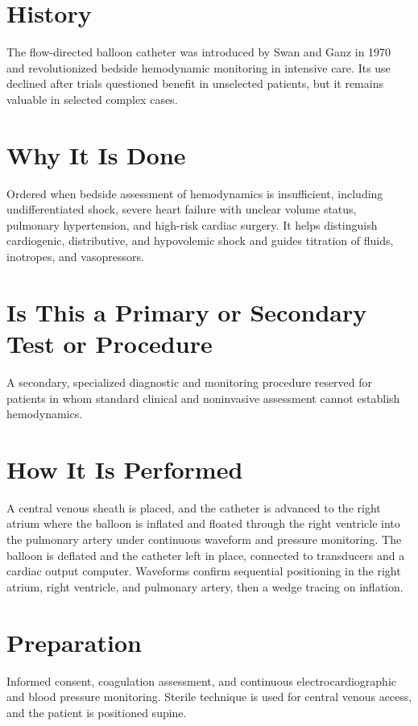 \section*{History}
The flow-directed balloon catheter was introduced by Swan and Ganz in 1970 and revolutionized bedside hemodynamic monitoring in intensive care. Its use declined after trials questioned benefit in unselected patients, but it remains valuable in selected complex cases.

\section*{Why It Is Done}
Ordered when bedside assessment of hemodynamics is insufficient, including undifferentiated shock, severe heart failure with unclear volume status, pulmonary hypertension, and high-risk cardiac surgery. It helps distinguish cardiogenic, distributive, and hypovolemic shock and guides titration of fluids, inotropes, and vasopressors.

\section*{Is This a Primary or Secondary Test or Procedure}
A secondary, specialized diagnostic and monitoring procedure reserved for patients in whom standard clinical and noninvasive assessment cannot establish hemodynamics.

\section*{How It Is Performed}
A central venous sheath is placed, and the catheter is advanced to the right atrium where the balloon is inflated and floated through the right ventricle into the pulmonary artery under continuous waveform and pressure monitoring. The balloon is deflated and the catheter left in place, connected to transducers and a cardiac output computer. Waveforms confirm sequential positioning in the right atrium, right ventricle, and pulmonary artery, then a wedge tracing on inflation.

\section*{Preparation}
Informed consent, coagulation assessment, and continuous electrocardiographic and blood pressure monitoring. Sterile technique is used for central venous access, and the patient is positioned supine.

